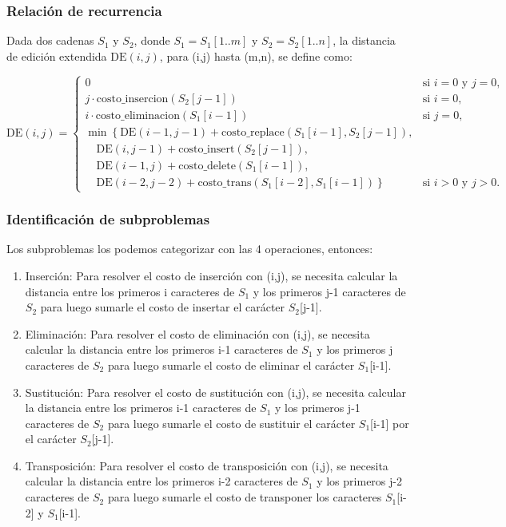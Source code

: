 \subsubsection{Relación de recurrencia}

Dada dos cadenas \( S_1 \) y \( S_2 \), 
donde \( S_1 = S_1[1..m] \) y \( S_2 = S_2[1..n] \),
la distancia de edición extendida 
\( \text{DE}(i, j) \), para (i,j) hasta (m,n), se define  como:

\[  
\text{DE}(i, j) = 
\begin{cases}
0 & \text{si } i = 0 \text{ y } j = 0, \\
j \cdot \text{costo\_insercion}(S_2[j-1]) & \text{si } i = 0, \\
i \cdot \text{costo\_eliminacion}(S_1[i-1]) & \text{si } j = 0, \\
\min\left\{
\text{DE}(i-1, j-1) + \text{costo\_replace}(S_1[i-1], S_2[j-1]), \right. \\
\quad \left. \text{DE}(i, j-1) + \text{costo\_insert}(S_2[j-1]), \right. \\
\quad \left. \text{DE}(i-1, j) + \text{costo\_delete}(S_1[i-1]), \right. \\
\quad \left. \text{DE}(i-2, j-2) + \text{costo\_trans}(S_1[i-2], S_1[i-1]) \right\} 
& \text{si } i > 0 \text{ y } j > 0.
\end{cases}
\]

\subsubsection{Identificación de subproblemas}

Los subproblemas los podemos categorizar con las 4 operaciones, entonces:

\begin{enumerate}
    \item Inserción: Para resolver el costo de inserción con (i,j), se necesita
    calcular la distancia entre los primeros i caracteres de $S_1$ y los primeros
    j-1 caracteres de $S_2$ para luego sumarle el costo de insertar el carácter
    $S_2$[j-1].
    \item Eliminación: Para resolver el costo de eliminación con (i,j), se necesita
    calcular la distancia entre los primeros i-1 caracteres de $S_1$ y los primeros
    j caracteres de $S_2$ para luego sumarle el costo de eliminar el carácter
    $S_1$[i-1].
    \item Sustitución: Para resolver el costo de sustitución con (i,j), se necesita
    calcular la distancia entre los primeros i-1 caracteres de $S_1$ y los primeros
    j-1 caracteres de $S_2$ para luego sumarle el costo de sustituir el carácter
    $S_1$[i-1] por el carácter $S_2$[j-1].
    \item Transposición: Para resolver el costo de transposición con (i,j), se necesita
    calcular la distancia entre los primeros i-2 caracteres de $S_1$ y los primeros
    j-2 caracteres de $S_2$ para luego sumarle el costo de transponer los caracteres
    $S_1$[i-2] y $S_1$[i-1].

\end{enumerate}

